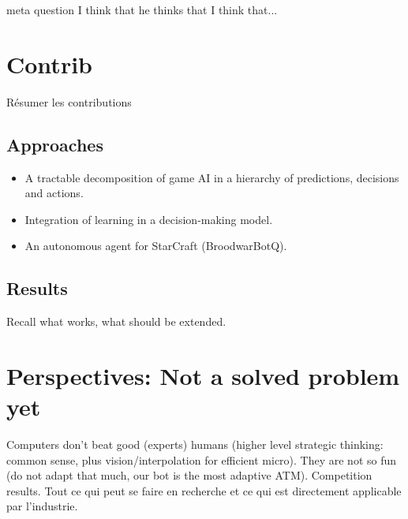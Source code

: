 meta question I think that he thinks that I think that...

\section{Contrib}
Résumer les contributions
\subsection{Approaches}
\begin{itemize}
\item A tractable decomposition of game AI in a hierarchy of predictions, decisions and actions.
\item Integration of learning in a decision-making model. 
\item An autonomous agent for StarCraft (BroodwarBotQ).
\end{itemize}

\subsection{Results}
Recall what works, what should be extended.

\section{Perspectives: Not a solved problem yet}
Computers don't beat good (experts) humans (higher level strategic thinking: common sense, plus vision/interpolation for efficient micro). They are not so fun (do not adapt that much, our bot is the most adaptive ATM). Competition results.
Tout ce qui peut se faire en recherche et ce qui est directement applicable par l'industrie.


